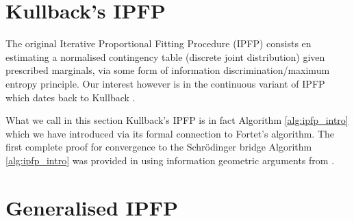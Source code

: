 \documentclass[a4paper,12pt,twoside,openright]{report}
\theoremstyle{definition}
\begin{document}
\section{Kullback's IPFP}
The original Iterative Proportional Fitting Procedure (IPFP) consists en estimating a normalised contingency table (discrete joint distribution) given prescribed marginals, via some form of information discrimination/maximum entropy principle. Our interest however is in the continuous variant of IPFP which dates back to Kullback \citep{kullback1968probability}.

What we call in this section Kullback's IPFP is in fact Algorithm \ref{alg:ipfp_intro} which we have introduced via its formal connection to Fortet's algorithm.  The first complete proof for convergence to the  Schrödinger bridge Algorithm \ref{alg:ipfp_intro} was provided in \cite{ruschendorf1995convergence} using information geometric arguments from \cite{csiszar1975divergence}.


\section{Generalised IPFP}
\end{document}

